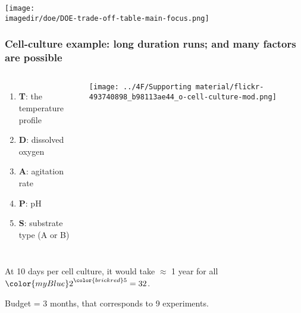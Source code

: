\documentclass[11pt,aspectratio=169,mathserif]{beamer}
\begin{document}
\begin{frame}\frametitle{}
	\centerline{\texttt{[image: \\imagedir/doe/DOE-trade-off-table-main-focus.png]}}
\end{frame}

\begin{frame}\frametitle{Cell-culture example: long duration runs; and many factors are possible}
	\newcommand{\white}{\color{white}}
	\begin{columns}[c]
			\begin{enumerate}
				\item	\textbf{T}: the temperature profile
				\item	\textbf{D}: dissolved oxygen
				\item	\textbf{A}: agitation rate
				\item	\textbf{P}: pH
				\item	\textbf{S}: substrate type (A or B)
			\end{enumerate}
		
			
			\vspace{0.2cm}
			
			\centerline{\texttt{[image: ../4F/Supporting material/flickr-493740898\_b98113ae44\_o-cell-culture-mod.png]}}
	\end{columns}

	\vfill
	At 10 days per cell culture, it would take $\approx$ 1 year for all  ${\color{myBlue} 2}^{\color{brickred} 5} = 32$.
	
	Budget = 3 months, {\color{myOrange} that corresponds to 9 experiments}.
		
\end{frame}
\end{document}
